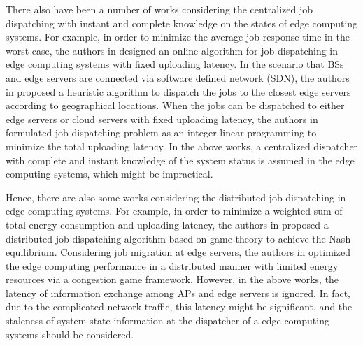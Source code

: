 There also have been a number of works considering the centralized job dispatching with instant and complete knowledge on the states of edge computing systems. For example, in order to minimize the average job response time in the worst case, the authors in \cite{tan-online} designed an online algorithm for job dispatching in edge computing systems with fixed uploading latency. In the scenario that BSs and edge servers are connected via software defined network (SDN), the authors in \cite{IOTJ18-FanQ} proposed a heuristic algorithm to dispatch the jobs to the closest edge servers according to geographical locations. When the jobs can be dispatched to either edge servers or cloud servers with fixed uploading latency, the authors in \cite{MASS18-MengZ} formulated job dispatching problem as an integer linear programming to minimize the total uploading latency.
In the above works, a centralized dispatcher with complete and instant knowledge of the system status is assumed in the edge computing systems, which might be impractical.

Hence, there are also some works considering the distributed job dispatching in edge computing systems. For example, in order to minimize a weighted sum of total energy consumption and uploading latency, the authors in \cite{ToN-Xuchen2016} proposed a distributed job dispatching algorithm based on game theory to achieve the Nash equilibrium. 
Considering job migration at edge servers, the authors in \cite{ToN-xujie2018} optimized the edge computing performance in a distributed manner with limited energy resources via a congestion game framework.
However, in the above works, the latency of information exchange among APs and edge servers is ignored.
In fact, due to the complicated network traffic, this latency might be significant, and the staleness of system state information at the dispatcher of a edge computing systems should be considered.

